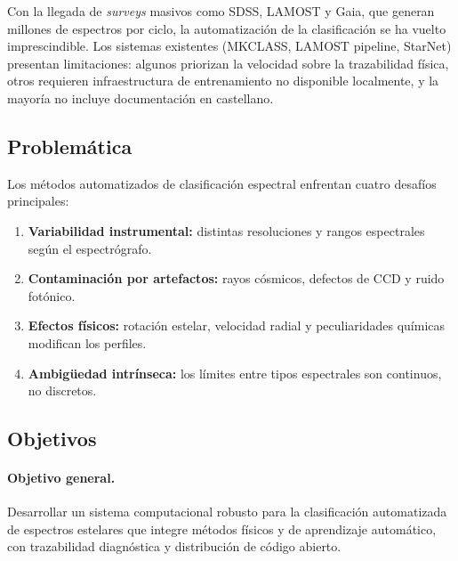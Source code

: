 \documentclass[12pt,a4paper]{article}
\begin{document}
Con la llegada de \emph{surveys} masivos como SDSS, LAMOST y Gaia, que generan
millones de espectros por ciclo, la automatización de la clasificación se ha vuelto
imprescindible. Los sistemas existentes (MKCLASS, LAMOST pipeline, StarNet)
presentan limitaciones: algunos priorizan la velocidad sobre la trazabilidad física,
otros requieren infraestructura de entrenamiento no disponible localmente, y la mayoría
no incluye documentación en castellano.

\subsection{Problemática}

Los métodos automatizados de clasificación espectral enfrentan cuatro desafíos
principales:
\begin{enumerate}
  \item \textbf{Variabilidad instrumental:} distintas resoluciones y rangos espectrales
        según el espectrógrafo.
  \item \textbf{Contaminación por artefactos:} rayos cósmicos, defectos de CCD y ruido
        fotónico.
  \item \textbf{Efectos físicos:} rotación estelar, velocidad radial y peculiaridades
        químicas modifican los perfiles.
  \item \textbf{Ambigüedad intrínseca:} los límites entre tipos espectrales son
        continuos, no discretos.
\end{enumerate}

\subsection{Objetivos}

\paragraph{Objetivo general.}
Desarrollar un sistema computacional robusto para la clasificación automatizada de
espectros estelares que integre métodos físicos y de aprendizaje automático, con
trazabilidad diagnóstica y distribución de código abierto.
\end{document}
